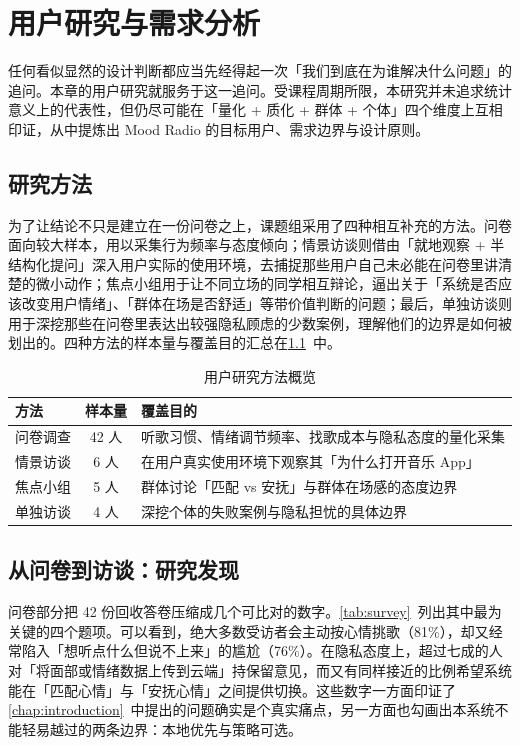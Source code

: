 \chapter{用户研究与需求分析}\label{chap:requirement}

任何看似显然的设计判断都应当先经得起一次「我们到底在为谁解决什么问题」的追问。本章的用户研究就服务于这一追问。受课程周期所限，本研究并未追求统计意义上的代表性，但仍尽可能在「量化 + 质化 + 群体 + 个体」四个维度上互相印证，从中提炼出 Mood Radio 的目标用户、需求边界与设计原则。

\section{研究方法}

为了让结论不只是建立在一份问卷之上，课题组采用了四种相互补充的方法。问卷面向较大样本，用以采集行为频率与态度倾向；情景访谈则借由「就地观察 + 半结构化提问」深入用户实际的使用环境，去捕捉那些用户自己未必能在问卷里讲清楚的微小动作；焦点小组用于让不同立场的同学相互辩论，逼出关于「系统是否应该改变用户情绪」、「群体在场是否舒适」等带价值判断的问题；最后，单独访谈则用于深挖那些在问卷里表达出较强隐私顾虑的少数案例，理解他们的边界是如何被划出的。四种方法的样本量与覆盖目的汇总在\cref{tab:research-methods}~中。

\begin{table}[!htb]
  \centering
  \caption{用户研究方法概览}\label{tab:research-methods}
  \begin{tabularx}{\linewidth}{lcX}
    \toprule
    \textbf{方法} & \textbf{样本量} & \textbf{覆盖目的} \\
    \midrule
    问卷调查    & 42 人 & 听歌习惯、情绪调节频率、找歌成本与隐私态度的量化采集 \\
    情景访谈    & 6 人  & 在用户真实使用环境下观察其「为什么打开音乐 App」 \\
    焦点小组    & 5 人  & 群体讨论「匹配 vs 安抚」与群体在场感的态度边界 \\
    单独访谈    & 4 人  & 深挖个体的失败案例与隐私担忧的具体边界 \\
    \bottomrule
  \end{tabularx}
\end{table}

\section{从问卷到访谈：研究发现}

问卷部分把 42 份回收答卷压缩成几个可比对的数字。\cref{tab:survey}~列出其中最为关键的四个题项。可以看到，绝大多数受访者会主动按心情挑歌（81\%），却又经常陷入「想听点什么但说不上来」的尴尬（76\%）。在隐私态度上，超过七成的人对「将面部或情绪数据上传到云端」持保留意见，而又有同样接近的比例希望系统能在「匹配心情」与「安抚心情」之间提供切换。这些数字一方面印证了\cref{chap:introduction}~中提出的问题确实是个真实痛点，另一方面也勾画出本系统不能轻易越过的两条边界：本地优先与策略可选。

